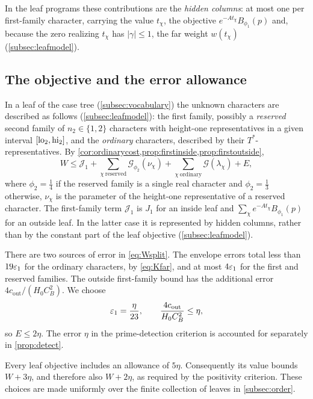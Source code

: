 In the leaf programs these contributions are the \emph{hidden columns}: at most one per
first-family character, carrying the value $t_\chi$, the objective $e^{-At_\chi}B_{\phi_1}(p)$ and,
because the zero realizing $t_\chi$ has $|\gamma|\le1$, the far weight $w(t_\chi)$
(\cref{subsec:leafmodel}).

\subsection{The objective and the error allowance}\label{subsec:allowance}
In a leaf of the case tree (\cref{subsec:vocabulary}) the unknown characters are described as follows (\cref{subsec:leafmodel}): the
first family, possibly a \emph{reserved} second family of $n_2\in\{1,2\}$ characters with
height-one representatives in a given interval $[\mathrm{lo}_2,\mathrm{hi}_2]$, and the \emph{ordinary}
characters, described by their $T^*$-representatives. By
\cref{cor:ordinarycost,prop:firstinside,prop:firstoutside},
\begin{equation}\label{eq:Wsplit}
  W\le\mathcal J_1+\sum_{\chi\ \mathrm{reserved}}\mathcal G_{\phi_2}(\nu_\chi)
  +\sum_{\chi\ \mathrm{ordinary}}\mathcal G(\lambda_\chi)+E,
\end{equation}
where $\phi_2=\frac14$ if the reserved family is a single real character and $\phi_2=\frac13$
otherwise, $\nu_\chi$ is the parameter of the height-one representative of a reserved
character. The first-family term $\mathcal J_1$ is $J_1$ for an inside leaf and
$\sum_\chi e^{-At_\chi}B_{\phi_1}(p)$ for an outside leaf. In the latter case it is
represented by hidden columns, rather than by the constant part of the leaf objective
(\cref{subsec:leafmodel}).

There are two sources of error in \eqref{eq:Wsplit}. The envelope errors total less
than $19\varepsilon_1$ for the ordinary characters, by \eqref{eq:Kfar}, and at most
$4\varepsilon_1$ for the first and reserved families. The outside first-family bound has the
additional error $4c_{\mathrm{out}}/(H_0C_B^2)$. We choose
\[
  \varepsilon_1=\frac\eta{23},\qquad
  \frac{4c_{\mathrm{out}}}{H_0C_B^2}\le\eta,
\]
so $E\le2\eta$. The error $\eta$ in the prime-detection criterion is accounted for
separately in \cref{prop:detect}.

Every leaf objective includes an allowance of $5\eta$. Consequently its value bounds
$W+3\eta$, and therefore also $W+2\eta$, as required by the positivity criterion.
These choices are made uniformly over the finite collection of leaves in
\cref{subsec:order}.
